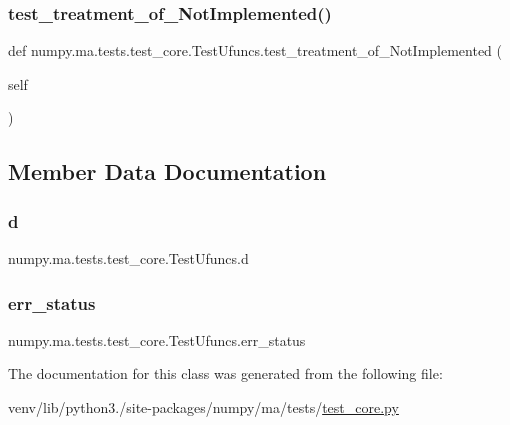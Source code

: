 \subsubsection{\texorpdfstring{test\+\_\+treatment\+\_\+of\+\_\+\+Not\+Implemented()}{test\_treatment\_of\_NotImplemented()}}
{\footnotesize\ttfamily def numpy.\+ma.\+tests.\+test\+\_\+core.\+Test\+Ufuncs.\+test\+\_\+treatment\+\_\+of\+\_\+\+Not\+Implemented (\begin{DoxyParamCaption}\item[{}]{self }\end{DoxyParamCaption})}



\subsection{Member Data Documentation}
\mbox{\label{classnumpy_1_1ma_1_1tests_1_1test__core_1_1TestUfuncs_a01aef20ce777113fc76cc8c8af6221d3}} 
\subsubsection{\texorpdfstring{d}{d}}
{\footnotesize\ttfamily numpy.\+ma.\+tests.\+test\+\_\+core.\+Test\+Ufuncs.\+d}

\mbox{\label{classnumpy_1_1ma_1_1tests_1_1test__core_1_1TestUfuncs_a94e0fa9a5562c31dd4092aad1fc09905}} 
\subsubsection{\texorpdfstring{err\+\_\+status}{err\_status}}
{\footnotesize\ttfamily numpy.\+ma.\+tests.\+test\+\_\+core.\+Test\+Ufuncs.\+err\+\_\+status}



The documentation for this class was generated from the following file\+:\begin{DoxyCompactItemize}
\item 
venv/lib/python3./site-\/packages/numpy/ma/tests/\hyperlink{numpy_2ma_2tests_2test__core_8py}{test\+\_\+core.\+py}\end{DoxyCompactItemize}
